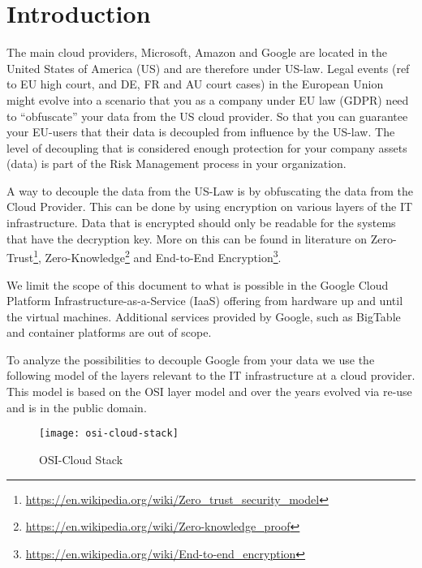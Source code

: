 
\section{Introduction}
The main cloud providers, Microsoft, Amazon and Google 
are located in the United States of America (US) 
and are therefore under US-law. 
Legal events (ref to EU high court, and DE, FR and AU court cases) 
in the European Union might evolve into a scenario 
that you as a company under EU law (GDPR) need to “obfuscate” your data 
from the US cloud provider. 
So that you can guarantee your EU-users 
that their data is decoupled from influence by the US-law. 
The level of decoupling that is considered enough protection 
for your company assets (data) 
is part of the Risk Management process in your organization. 

A way to decouple the data from the US-Law 
is by obfuscating the data from the Cloud Provider. 
This can be done by using encryption on various layers of the IT infrastructure. 
Data that is encrypted should only be readable for the systems 
that have the decryption key. 
More on this can be found in literature on 
Zero-Trust\footnote{\url{https://en.wikipedia.org/wiki/Zero_trust_security_model}}, 
Zero-Knowledge\footnote{\url{https://en.wikipedia.org/wiki/Zero-knowledge_proof}} and 
End-to-End Encryption\footnote{\url{https://en.wikipedia.org/wiki/End-to-end_encryption}}. 

We limit the scope of this document to what is possible 
in the Google Cloud Platform Infrastructure-as-a-Service (IaaS) 
offering from hardware up and until the virtual machines. 
Additional services provided by Google, 
such as BigTable and container platforms are out of scope. 

To analyze the possibilities to decouple Google 
from your data we use the following model of the layers relevant to the IT infrastructure at a cloud provider. 
This model is based on the OSI layer model 
and over the years evolved via re-use 
and is in the public domain. 

\begin{figure}[!ht]
    \centering
    \texttt{[image: osi-cloud-stack]}
    \caption{OSI-Cloud Stack}
    \label{fig:osi-cloud-stack}
\end{figure}